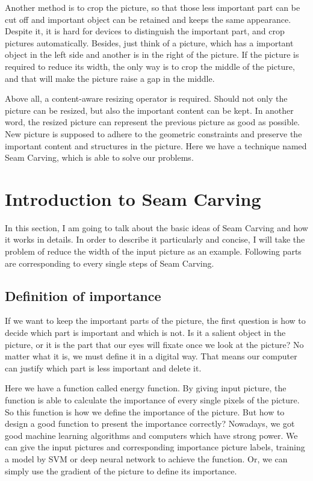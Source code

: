 \documentclass[final]{cvpr}
\begin{document}
Another method is to crop the picture, so that those less important part can be cut off and important object can be retained and keeps the same appearance. Despite it, it is hard for devices to distinguish the important part, and crop pictures automatically. Besides, just think of a picture, which has a important object in the left side and another is in the right of the picture. If the picture is required to reduce its width, the only way is to crop the middle of the picture, and that will make the picture raise a gap in the middle.

Above all, a content-aware resizing operator is required. Should not only the picture can be resized, but also the important content can be kept. In another word, the resized picture can represent the previous picture as good as possible. New picture is supposed to adhere to the geometric constraints and preserve the important content and structures in the picture. Here we have a technique named Seam Carving, which is able to solve our problems.

\section{Introduction to Seam Carving}
In this section, I am going to talk about the basic ideas of Seam Carving and how it works in details. In order to describe it particularly and concise, I will take the problem of reduce the width of the input picture as an example. Following parts are corresponding to every single steps of Seam Carving.
\subsection{Definition of importance}
If we want to keep the important parts of the picture, the first question is how to decide which part is important and which is not. Is it a salient object in the picture, or it is the part that our eyes will fixate once we look at the picture? No matter what it is, we must define it in a digital way. That means our computer can justify which part is less important and delete it.

Here we have a function called energy function. By giving input picture, the function is able to calculate the importance of every single pixels of the picture. So this function is how we define the importance of the picture. But how to design a good function to present the importance correctly? Nowadays, we got good machine learning algorithms and computers which have strong power. We can give the input pictures and corresponding importance picture labels, training a model by SVM or deep neural network to achieve the function. Or, we can simply use the gradient of the picture to define its importance.
\end{document}
